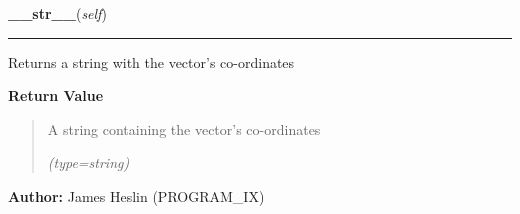     \label{pystroke:vector2:Vector2:__str__}

    \vspace{0.5ex}

\hspace{.8\funcindent}\begin{boxedminipage}{\funcwidth}

    \raggedright \textbf{\_\_str\_\_}(\textit{self})

    \vspace{-1.5ex}

    \rule{\textwidth}{0.5\fboxrule}
\setlength{\parskip}{2ex}
    Returns a string with the vector's co-ordinates

\setlength{\parskip}{1ex}
      \textbf{Return Value}
    \vspace{-1ex}

      \begin{quote}
      A string containing the vector's co-ordinates

      {\it (type=string)}

      \end{quote}

\textbf{Author:} James Heslin (PROGRAM\_IX)



    \end{boxedminipage}

    \label{pystroke:vector2:Vector2:from_points}

    \vspace{0.5ex}

